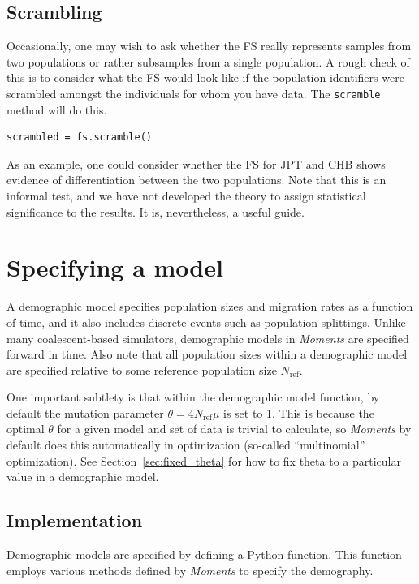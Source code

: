 \documentclass[12pt]{article}
\makeatletter
\newcommand{\Nref}{\ensuremath{N_\text{ref}}\xspace}
\newcommand{\py}[1]{\lstinline[breaklines=true,language=Python, showstringspaces=False]@#1@}
\makeatother
\begin{document}
\subsection{Scrambling}

Occasionally, one may wish to ask whether the FS really represents samples from two populations or rather subsamples from a single population.
A rough check of this is to consider what the FS would look like if the population identifiers were scrambled amongst the individuals for whom you have data.
The \py{scramble} method will do this.
\begin{lstlisting}
scrambled = fs.scramble()
\end{lstlisting}
As an example, one could consider whether the FS for JPT and CHB shows evidence of differentiation between the two populations.
Note that this is an informal test, and we have not developed the theory to assign statistical significance to the results.
It is, nevertheless, a useful guide.

\section{Specifying a model}

A demographic model specifies population sizes and migration rates as a function of time, and it also includes discrete events such as population splittings.
Unlike many coalescent-based simulators, demographic models in \textit{Moments} are specified forward in time.
Also note that all population sizes within a demographic model are specified relative to some reference population size \Nref.

One important subtlety is that within the demographic model function, by default the mutation parameter $\theta = 4 \Nref \mu$ is set to 1.
This is because the optimal $\theta$ for a given model and set of data is trivial to calculate, so \textit{Moments} by default does this automatically in optimization (so-called ``multinomial'' optimization).
See Section~\ref{sec:fixed_theta} for how to fix theta to a particular value in a demographic model.

\subsection{Implementation}

Demographic models are specified by defining a Python function.
This function employs various methods defined by \textit{Moments} to specify the demography.
\end{document}
